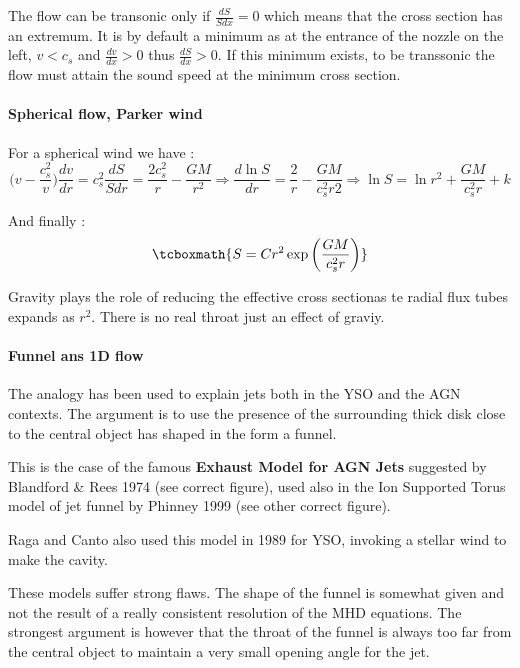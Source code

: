 \documentclass[10pt,a4paper,english,draft]{article}
\begin{document}
The flow can be transonic only if $\frac{dS}{Sdx} = 0 $ which means that the cross section
has an extremum. It is by default a minimum as at the entrance of the nozzle on the left,  $v<c_s$ and
$\frac{dv}{dx} > 0$ thus $\frac{dS}{dx} > 0 $. If this minimum exists, to be transsonic the flow must
attain the sound speed at the minimum cross section.
  
\paragraph{Spherical flow, Parker wind}
  
For a spherical wind we have : 
\begin{equation}
\bigg( v - \frac{c_s^2}{v}  \bigg)\frac{dv}{dr} = c_s^2\frac{dS}{Sdr} 
= \frac{2c_s^2}{r} - \frac{GM}{r^2} \Rightarrow \frac{d \ln S}{dr} = 
\frac{2}{r} - \frac{GM}{c_s^2 r2}   
\Rightarrow \ln S = \ln r^2 +\frac{GM}{c_s^2r} + k
\end{equation}

And finally : 
\begin{equation}
 \tcboxmath{S = Cr^2 \exp\bigg(\frac{GM}{c_s^2 r}\bigg)}
\end{equation}
 
 Gravity plays the role of reducing the effective cross sectionas te radial flux tubes expands 
 as $r^2$. There is no real throat just an effect of graviy.
  
\paragraph{Funnel ans 1D flow}
The analogy has been used to explain jets both in the YSO  and the AGN contexts. The argument 
is to use the presence of the surrounding thick disk close to the central object has shaped in 
the form a funnel.

This is the case of the famous \textbf{ Exhaust Model for AGN Jets} suggested by 
Blandford  \&  Rees 1974 (see correct figure), used also in the Ion Supported Torus
model of jet funnel by Phinney 1999 (see other correct figure).


Raga and Canto also used this model in 1989 for YSO, invoking a stellar wind to make 
the cavity.


These models suffer strong flaws. The shape of the funnel is somewhat given and 
not the result of a really consistent resolution of the MHD equations. The strongest argument
is however that the throat of the funnel is always too far from the central object to maintain 
a very small opening angle for the jet.
\end{document}
